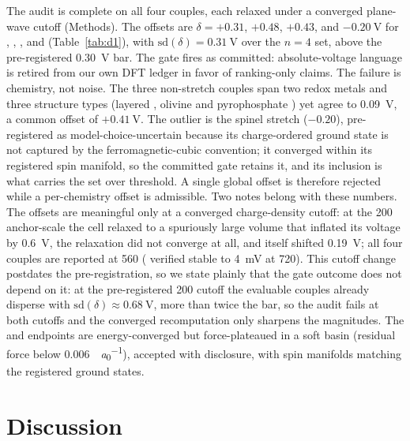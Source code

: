 \documentclass[reprint,aps,prb,amsmath,amssymb,nofootinbib,longbibliography]{revtex4-2}
\begin{document}
The audit is complete on all four couples, each relaxed under a converged
plane-wave cutoff (Methods). The offsets are $\delta=+0.31$, $+0.48$, $+0.43$,
and $-\SI{0.20}{\volt}$ for , , , and
 (Table~\ref{tab:d1}), with $\mathrm{sd}(\delta)=\SI{0.31}{\volt}$
over the $n=4$ set, above the pre-registered \SI{0.30}{\volt} bar. The gate
fires as committed: absolute-voltage language is retired from our own DFT
ledger in favor of ranking-only claims. The failure is chemistry, not noise.
The three non-stretch couples span two redox metals and three structure types
(layered , olivine and pyrophosphate ) yet agree to
\SI{0.09}{\volt}, a common offset of $+\SI{0.41}{\volt}$. The outlier is the
 spinel stretch ($-0.20$), pre-registered as model-choice-uncertain
because its charge-ordered ground state is not captured by the
ferromagnetic-cubic convention; it converged within its registered spin
manifold, so the committed gate retains it, and its inclusion is what carries
the set over threshold. A single global offset is therefore rejected while a
per-chemistry offset is admissible. Two notes belong with these numbers. The
offsets are meaningful only at a converged charge-density cutoff: at the
\SI{200}{\rydberg} anchor-scale the  cell relaxed to a spuriously
large volume that inflated its voltage by \SI{0.6}{\volt}, the 
relaxation did not converge at all, and  itself shifted
\SI{0.19}{\volt}; all four couples are reported at \SI{560}{\rydberg}
( verified stable to \SI{4}{\milli\volt} at \SI{720}{\rydberg}).
This cutoff change postdates the pre-registration, so we state plainly that
the gate outcome does not depend on it: at the pre-registered \SI{200}{\rydberg}
cutoff the evaluable couples already disperse with $\mathrm{sd}(\delta)\approx
\SI{0.68}{\volt}$, more than twice the bar, so the audit fails at both cutoffs
and the converged recomputation only sharpens the magnitudes.
The  and  endpoints are energy-converged but
force-plateaued in a soft basin (residual force below
\SI{0.006}{\rydberg\per\bohr}), accepted with disclosure, with spin manifolds
matching the registered ground states.

\section{Discussion}
\label{sec:discussion}
\end{document}
